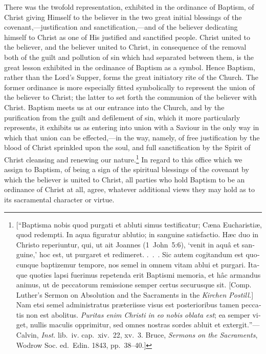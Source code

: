 \documentclass[
  english,
]{book}
\providecommand{\textlatin}{}
\renewcommand{\textlatin}[2][]{\foreignlanguage{latin}{#2}}
\newcommand{\textgerman}[2][]{\foreignlanguage{ngerman}{#2}}
\begin{document}
There was the twofold representation, exhibited in the ordinance of Baptism, of Christ giving Himself to the believer in the two great initial blessings of the covenant,---justification and sanctification,---and of the believer dedicating himself to Christ as one of His justified and sanctified people. Christ united to the believer, and the believer united to Christ, in consequence of the removal both of the guilt and pollution of sin which had separated between them, is the great lesson exhibited in the ordinance of Baptism as a symbol. Hence Baptism, rather than the Lord's Supper, forms the great initiatory rite of the Church. The former ordinance is more especially fitted symbolically to represent the union of the believer to Christ; the latter to set forth the communion of the believer with Christ. Baptism meets us at our entrance into the Church, and by the purification from the guilt and defilement of sin, which it more particularly represents, it exhibits us as entering into union with a Saviour in the only way in which that union can be effected,---in the way, namely, of free justification by the blood of Christ sprinkled upon the soul, and full sanctification by the Spirit of Christ cleansing and renewing our nature.\footnote{{[}``\textlatin{Baptisma nobis quod purgati et abluti simus testificatur; Cæna Eucharistiæ, quod redempti. In aqua figuratur ablutio; in sanguine satisfactio. Hæc duo in Christo reperiuntur, qui, ut ait Joannes (1~John~5:6), `venit in aquâ et sanguine,' hoc est, ut purgaret et redimeret. .~.~. Sic autem cogitandum est quocunque baptizemur tempore, nos semel in omnem vitam ablui et purgari. Itaque quoties lapsi fuerimus repetenda erit Baptismi memoria, et hâc armandus animus, ut de peccatorum remissione semper certus securusque sit.} {[}Comp. Luther's Sermon on Absolution and the Sacraments in the \textgerman{\emph{Kirchen Postill.}}{]} \textlatin{Nam etsi semel administratus præteriisse visus est posterioribus tamen peccatis non est abolitus. \emph{Puritas enim Christi in eo nobis oblata est}; ea semper viget, nullis maculis opprimitur, sed omnes nostras sordes abluit et extergit.}''---Calvin, \emph{Inst.} lib.~iv. cap.~xiv.~22, xv.~3. Bruce, \emph{Sermons on the Sacraments}, Wodrow Soc. ed.~Edin. 1843, pp.~38--40.{]}} In regard to this office which we assign to Baptism, of being a sign of the spiritual blessings of the covenant by which the believer is united to Christ, all parties who hold Baptism to be an ordinance of Christ at all, agree, whatever additional views they may hold as to its sacramental character or virtue.
\end{document}
